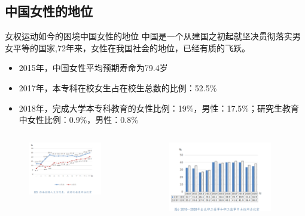 \documentclass{beamer}
\begin{document}
	\subsection*{中国女性的地位}
	\begin{frame}{女权运动如今的困境}{中国女性的地位}
		中国是一个从建国之初起就坚决贯彻落实男女平等的国家,72年来，女性在我国社会的地位，已经有质的飞跃。
		\begin{itemize}
			\item 2015年，中国女性平均预期寿命为79.4岁
			\item 2017年，本专科在校女生占在校生总数的比例：52.5\%
			\item 2018年，完成大学本专科教育的女性比例：19\%，男性：17.5\%；研究生教育中女性比例：0.9\%，男性：0.8\%
		\end{itemize}
		\begin{columns}
			\begin{figure}
				\centering
				\includegraphics[width=0.9\textwidth]{img/图片7.png}
			\end{figure}

			\begin{figure}
				\centering
				\includegraphics[width=0.9\textwidth]{img/图片8.png}
			\end{figure}
		\end{columns}
	\end{frame}
\end{document}
